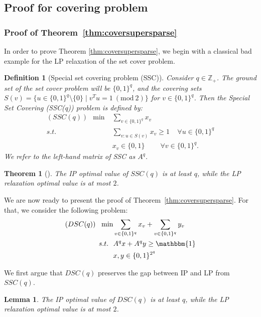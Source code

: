 \documentclass[smallextended]{svjour3}
\newtheorem{definition}[proposition]{Definition}
\newtheorem{lemma}[proposition]{Lemma}
\newtheorem{theorem}[proposition]{Theorem}
\begin{document}
\subsection{Proof for covering problem}\label{sec:proofcovering}

\subsubsection{Proof of Theorem~\ref{thm:coversupersparse}}
In order to prove Theorem \ref{thm:coversupersparse}, we begin with a classical bad example for the LP relaxation of the set cover problem.

\begin{definition}[Special set covering problem (SSC)]
	Consider $q \in \mathbb{Z}_+$. The ground set of the set cover problem will be $\{0,1\}^q$, and the covering sets $S(v) = \{ u \in \{0,1\}^q \setminus \{{0}\} \mid v^T u = 1 {\ (\text{mod}\ {2})}\}$ for $v \in \{0,1\}^q$. Then the Special Set Covering (SSC(q)) problem is defined by:
		\begin{align*}
		(SSC(q))~~\min &\sum_{v \in \{0,1\}^q} x_v  \\
		s.t.& \sum_{v : u \in S(v)} x_v \geq 1 ~~~~~\forall u \in \{0,1\}^q\\
		& x_v \in \{0,1\}  ~~~~~~~~~~\forall v \in \{0,1\}^q.
	\end{align*}
We refer to the left-hand matrix of SSC as $A^q$.
\end{definition}

\begin{theorem}[\cite{lovasz:1975}]\label{thm:knownresult}
The IP optimal value of $SSC(q)$ is at least $q$, while the LP relaxation optimal value is at most $2$. 
\end{theorem}

	We are now ready to present the proof of Theorem~\ref{thm:coversupersparse}. For that, we consider the following problem:
		\begin{align*}
		(DSC(q))~~\min& \sum_{v \in \{0,1\}^q} x_v +  \sum_{v \in \{0,1\}^q} y_v\\
		s.t. ~~&A^q x + A^q y \geq {\mathbbm{1}}\\
		& x,y \in \{0,1\}^{2^q}
	\end{align*}

We first argue that $DSC(q)$ preserves the gap between IP and LP from $SSC(q)$.

\begin{lemma}
	The IP optimal value of $DSC(q)$ is at least $q$, while the LP relaxation optimal value is at most $2$. 	
\end{lemma}
\end{document}

